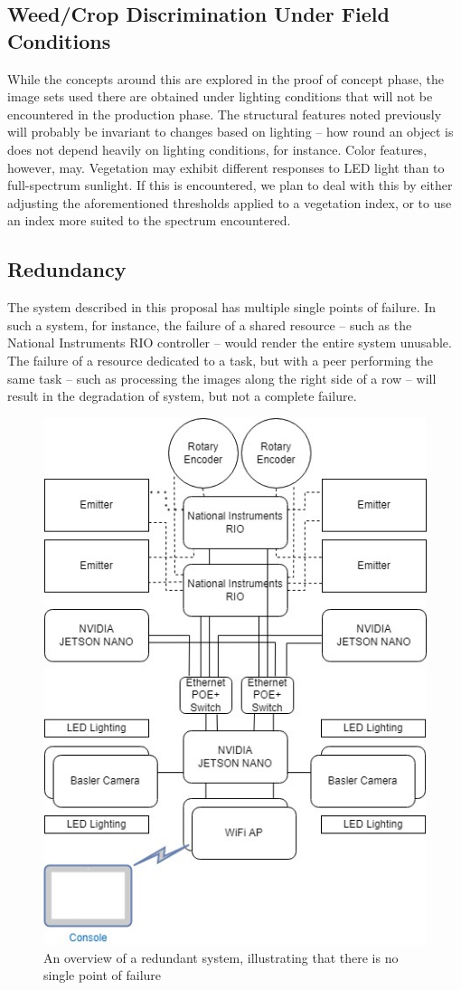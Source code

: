 \documentclass[12pt]{article}
\begin{document}
{\subsection{Weed/Crop Discrimination Under Field Conditions}
While the concepts around this are explored in the proof of concept phase, the image sets used there are obtained under lighting conditions that will  not be encountered in the production phase. The structural features noted previously will probably be invariant to changes based on lighting -- how round an object is does not depend heavily on lighting conditions, for instance. Color features, however, may. Vegetation may exhibit different responses to LED light than to full-spectrum sunlight. If this is encountered, we plan to deal with this by either adjusting the aforementioned thresholds applied to a vegetation index, or to use an index more suited to the spectrum encountered.


\subsection{Redundancy}
The system described in this proposal has multiple single points of failure. In such a system, for instance, the failure of a shared resource -- such as the National Instruments RIO controller -- would render the entire system unusable. The failure of a resource dedicated to a task, but with a peer performing the same task -- such as processing the images along the right side of a row -- will result in the degradation of system, but not a complete failure.
\begin{figure}[H]
	\centering
	\includegraphics[width=0.4\linewidth]{./figures/system-overview-Page-2.jpg}
	\caption[An overview of a redundant system]{An overview of a redundant system, illustrating that there is no single point of failure}
	\label{fig:system-overview-redundant}
\end{figure}

}
\end{document}
